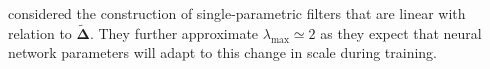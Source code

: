 \documentclass{article}
\newtheorem{definition}{Definition}[section]
\begin{document}




\citet{kipf2016gcn} considered the construction of single-parametric filters that are linear with relation to $\boldsymbol{\tilde{\Delta}}$. They further approximate $\lambda_{\max} \simeq 2$ as they expect that neural network parameters will adapt to this change in scale during training.
\end{document}
